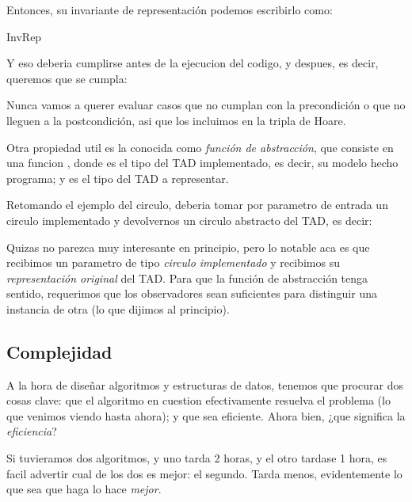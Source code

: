 \documentclass{article}
\begin{document}
Entonces, su invariante de representación podemos escribirlo como:

\begin{pred}{InvRep}{}

 \True

\end{pred}

Y eso deberia cumplirse antes de la ejecucion del codigo, y despues, es decir, queremos que se cumpla:


Nunca vamos a querer evaluar casos que no cumplan con la precondición o que no lleguen a la postcondición, asi que los incluimos en la tripla de Hoare.

Otra propiedad util es la conocida como \textit{función de abstracción}, que consiste en una funcion , donde  es el tipo del TAD implementado, es decir, su modelo hecho programa; y  es el tipo del TAD a representar.

Retomando el ejemplo del circulo, deberia tomar por parametro de entrada un circulo implementado y devolvernos un circulo abstracto del TAD, es decir:


Quizas no parezca muy interesante en principio, pero lo notable aca es que recibimos un parametro de tipo \textit{circulo implementado} y recibimos su \textit{representación original} del TAD. Para que la función de abstracción tenga sentido, requerimos que los observadores sean suficientes para distinguir una instancia de otra (lo que dijimos al principio).

\subsection{Complejidad}

A la hora de diseñar algoritmos y estructuras de datos, tenemos que procurar dos cosas clave: que el algoritmo en cuestion efectivamente resuelva el problema (lo que venimos viendo hasta ahora); y que sea eficiente. Ahora bien, ¿que significa la \textit{eficiencia}?

Si tuvieramos dos algoritmos, y uno tarda 2 horas, y el otro tardase 1 hora, es facil advertir cual de los dos es mejor: el segundo. Tarda menos, evidentemente lo que sea que haga lo hace \textit{mejor}.
\end{document}
